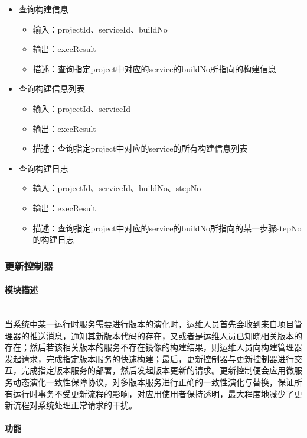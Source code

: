 \documentclass[a4paper, 12pt]{article}
\theoremstyle{definition}
\begin{document}
\begin{itemize}
{\begin{itemize}
		\end{itemize}}
	\item{查询构建信息
		\begin{itemize}
		\item 输入：projectId、serviceId、buildNo
		\item 输出：execResult
		\item 描述：查询指定project中对应的service的buildNo所指向的构建信息
		\end{itemize}}
	\item{查询构建信息列表
		\begin{itemize}
		\item 输入：projectId、serviceId
		\item 输出：execResult
		\item 描述：查询指定project中对应的service的所有构建信息列表
		\end{itemize}}
	\item{查询构建日志
		\begin{itemize}
		\item 输入：projectId、serviceId、buildNo、stepNo
		\item 输出：execResult
		\item 描述：查询指定project中对应的service的buildNo所指向的某一步骤stepNo的构建日志
		\end{itemize}}
\end{itemize}

\subsubsection{更新控制器}
\paragraph{模块描述}\mbox{}\\

当系统中某一运行时服务需要进行版本的演化时，运维人员首先会收到来自项目管理器的推送消息，通知其新版本代码的存在，又或者是运维人员已知晓相关版本的存在；然后若该相关版本的服务不存在镜像的构建结果，则运维人员向构建管理器发起请求，完成指定版本服务的快速构建；最后，更新控制器与更新控制器进行交互，完成指定版本服务的部署，然后发起版本更新的请求。更新控制便会应用微服务动态演化一致性保障协议，对多版本服务进行正确的一致性演化与替换，保证所有运行时事务不受更新流程的影响，对应用使用者保持透明，最大程度地减少了更新流程对系统处理正常请求的干扰。

\paragraph{功能}\mbox{}\\
\end{document}
